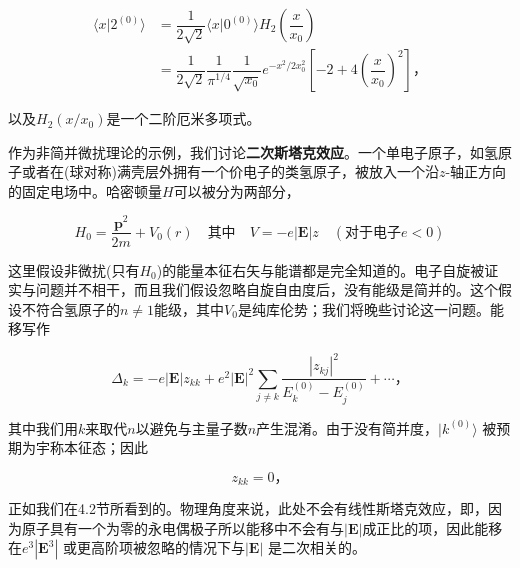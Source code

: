 ﻿\documentclass[UTF8,twoside]{ctexart}
\begin{document}
\begin{equation} \label{5.1.61}
\begin{split}
\langle x|2^{(0)}\rangle &= \dfrac{1}{2\sqrt{2}}\langle x|0^{(0)}\rangle H_2\left(\dfrac{x}{x_0}\right) \\
&= \dfrac{1}{2\sqrt{2}}\dfrac{1}{\pi^{1/4}}\dfrac{1}{\sqrt{x_0}}e^{-x^2/2x_0^2} \left[-2+4\left(\dfrac{x}{x_0}\right)^2\right]\text{，}
\end{split}
\end{equation}

\noindent 以及$H_2(x/x_0)$是一个二阶厄米多项式。

作为非简并微扰理论的示例，我们讨论{\textbf{二次斯塔克效应}}。一个单电子原子，如氢原子或者在(球对称)满壳层外拥有一个价电子的类氢原子，被放入一个沿$z$-轴正方向的固定电场中。哈密顿量$H$可以被分为两部分，

\begin{equation} \label{5.1.62}
H_0=\dfrac{\boldsymbol{p}^2}{2m}+V_0(r)\quad \text{其中} \quad V=-e|{\boldsymbol{E}}|z\quad(\text{对于电子}e<0)
\end{equation}


这里假设非微扰(只有$H_0$)的能量本征右矢与能谱都是完全知道的。电子自旋被证实与问题并不相干，而且我们假设忽略自旋自由度后，没有能级是简并的。这个假设不符合氢原子的$n\neq 1$能级，其中$V_0$是纯库伦势；我们将晚些讨论这一问题。能移写作

\begin{equation} \label{5.1.63}
\Delta_k=-e|{\boldsymbol{E}}|z_{kk}+e^2|{\boldsymbol{E}}|^2\displaystyle\sum_{j\neq k} \dfrac{|z_{kj}|^2}{E_k^{(0)}-E_j^{(0)}}+\cdots\text{，}
\end{equation}

\noindent 其中我们用$k$来取代$n$以避免与主量子数$n$产生混淆。由于没有简并度，$|k^{(0)}\rangle$ 被预期为宇称本征态；因此

\begin{equation} \label{5.1.64}
z_{kk}=0\text{，}
\end{equation}

\noindent 正如我们在4.2节所看到的。物理角度来说，此处不会有线性斯塔克效应，即，因为原子具有一个为零的永电偶极子所以能移中不会有与$|{\boldsymbol{E}}|$成正比的项，因此能移在$e^3|{\boldsymbol{E}}^3|$ 或更高阶项被忽略的情况下与$|{\boldsymbol{E}}|$ 是二次相关的。
\end{document}
